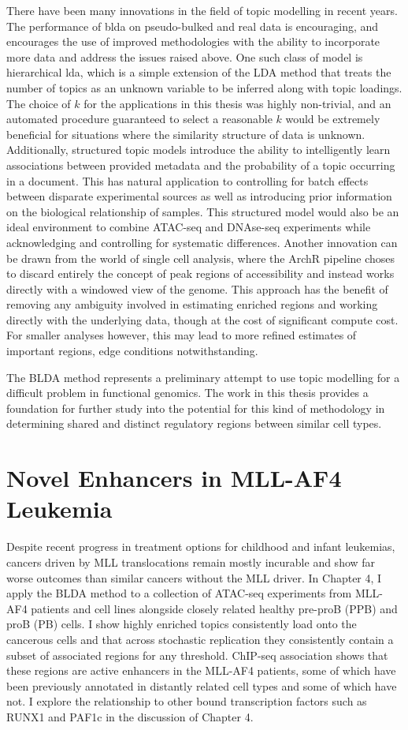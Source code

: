 There have been many innovations in the field of topic modelling in recent years. The performance of \gls{blda} on pseudo-bulked and real data is encouraging, and encourages the use of improved methodologies with the ability to incorporate more data and address the issues raised above. One such class of model is hierarchical \gls{lda}, which is a simple extension of the LDA method that treats the number of topics as an unknown variable to be inferred along with topic loadings. The choice of $k$ for the applications in this thesis was highly non-trivial, and an automated procedure guaranteed to select a reasonable $k$ would be extremely beneficial for situations where the similarity structure of data is unknown. Additionally, structured topic models introduce the ability to intelligently learn associations between provided metadata and the probability of a topic occurring in a document. This has natural application to controlling for batch effects between disparate experimental sources as well as introducing prior information on the biological relationship of samples. This structured model would also be an ideal environment to combine ATAC-seq and DNAse-seq experiments while acknowledging and controlling for systematic differences. Another innovation can be drawn from the world of single cell analysis, where the ArchR pipeline choses to discard entirely the concept of peak regions of accessibility and instead works directly with a windowed view of the genome. This approach has the benefit of removing any ambiguity involved in estimating enriched regions and working directly with the underlying data, though at the cost of significant compute cost. For smaller analyses however, this may lead to more refined estimates of important regions, edge conditions notwithstanding. 

The BLDA method represents a preliminary attempt to use topic modelling for a difficult problem in functional genomics. The work in this thesis provides a foundation for further study into the potential for this kind of methodology in determining shared and distinct regulatory regions between similar cell types. 

\section{Novel Enhancers in MLL-AF4 Leukemia}

Despite recent progress in treatment options for childhood and infant leukemias, cancers driven by MLL translocations remain mostly incurable and show far worse outcomes than similar cancers without the MLL driver. In Chapter 4, I apply the BLDA method to a collection of ATAC-seq experiments from MLL-AF4 patients and cell lines alongside closely related healthy pre-proB (PPB) and proB (PB) cells. I show highly enriched topics consistently load onto the cancerous cells and that across stochastic replication they consistently contain a subset of associated regions for any threshold. ChIP-seq association shows that these regions are active enhancers in the MLL-AF4 patients, some of which have been previously annotated in distantly related cell types and some of which have not. I explore the relationship to other bound transcription factors such as RUNX1 and PAF1c in the discussion of Chapter 4. 

